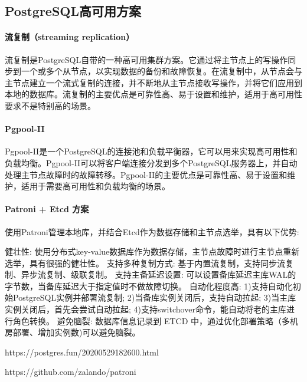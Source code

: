 \documentclass[../../../interview-questions.tex]{subfiles}
\begin{document}
\subsection{PostgreSQL高可用方案}

\paragraph{流复制（streaming replication）}

流复制是PostgreSQL自带的一种高可用集群方案。它通过将主节点上的写操作同步到一个或多个从节点，以实现数据的备份和故障恢复。在流复制中，从节点会与主节点建立一个流式复制的连接，并不断地从主节点接收写操作，并将它们应用到本地的数据库。流复制的主要优点是可靠性高、易于设置和维护，适用于高可用性要求不是特别高的场景。

\paragraph{Pgpool-II}

Pgpool-II是一个PostgreSQL的连接池和负载平衡器，它可以用来实现高可用性和负载均衡。Pgpool-II可以将客户端连接分发到多个PostgreSQL服务器上，并自动处理主节点故障时的故障转移。Pgpool-II的主要优点是可靠性高、易于设置和维护，适用于需要高可用性和负载均衡的场景。

\paragraph{Patroni + Etcd 方案}

使用Patroni管理本地库，并结合Etcd作为数据存储和主节点选举，具有以下优势:

健壮性: 使用分布式key-value数据库作为数据存储，主节点故障时进行主节点重新选举，具有很强的健壮性。
支持多种复制方式: 基于内置流复制，支持同步流复制、异步流复制、级联复制。
支持主备延迟设置: 可以设置备库延迟主库WAL的字节数，当备库延迟大于指定值时不做故障切换。
自动化程度高: 1)支持自动化初始PostgreSQL实例并部署流复制; 2)当备库实例关闭后，支持自动拉起; 3)当主库实例关闭后，首先会尝试自动拉起; 4)支持switchover命令，能自动将老的主库进行角色转换。
避免脑裂: 数据库信息记录到 ETCD 中，通过优化部署策略（多机房部署、增加实例数)可以避免脑裂。

https://postgres.fun/20200529182600.html

https://github.com/zalando/patroni
\end{document}
